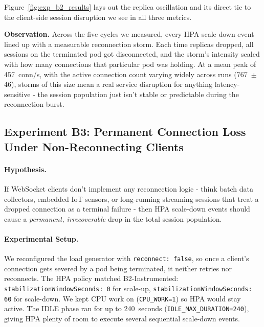 \documentclass[twocolumn]{svjour3}
\begin{document}
Figure~\ref{fig:exp_b2_results} lays out the replica oscillation and its direct
tie to the client-side session disruption we see in all three metrics.

\noindent\textbf{Observation.} Across the five cycles we measured, every HPA
scale-down event lined up with a measurable reconnection storm. Each time replicas
dropped, all sessions on the terminated pod got disconnected, and the storm's
intensity scaled with how many connections that particular pod was holding. At a
mean peak of 457~conn/s, with the active connection count varying widely across
runs (767~$\pm$46), storms of this size mean a real service disruption for
anything latency-sensitive - the session population just isn't stable or
predictable during the reconnection burst.

\subsection{Experiment B3: Permanent Connection Loss Under Non-Reconnecting Clients}
\label{sec:b3}

\paragraph{Hypothesis.} If WebSocket clients don't implement any reconnection
logic - think batch data collectors, embedded IoT sensors, or long-running
streaming sessions that treat a dropped connection as a terminal failure - then
HPA scale-down events should cause a \textit{permanent, irrecoverable} drop in the
total session population.

\paragraph{Experimental Setup.} We reconfigured the load generator with
\texttt{reconnect: false}, so once a client's connection gets severed by a pod
being terminated, it neither retries nor reconnects. The HPA policy matched
B2-Instrumented: \texttt{stabilizationWindowSeconds: 0} for scale-up,
\texttt{stabilizationWindowSeconds: 60} for scale-down. We kept CPU work on
(\texttt{CPU\_WORK=1}) so HPA would stay active. The IDLE phase ran for up to
240~seconds (\texttt{IDLE\_MAX\_DURATION=240}), giving HPA plenty of room to
execute several sequential scale-down events.
\end{document}
